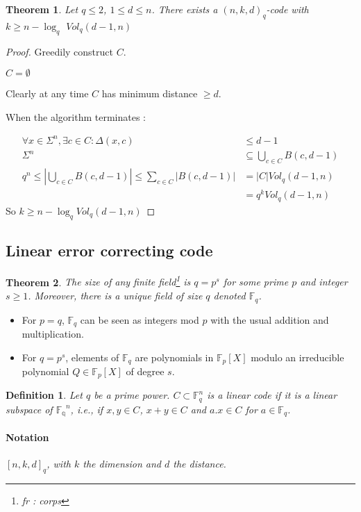 \documentclass{article}
\newtheorem{thm}{Theorem}
\newtheorem{defi}{Definition}
\begin{document}
\begin{thm}
Let $q\leq 2$, $1\leq d \leq n$. There exists a $(n,k,d)_q$-code with $k\geq n - \log_q$ $Vol_q(d-1,n)$
\end{thm}

\begin{proof}
Greedily construct $C$.

\begin{algorithm}
$C=\emptyset$\\
\end{algorithm}

Clearly at any time $C$ has minimum distance $\geq d$.

When the algorithm terminates :

\begin{align*}
\forall x \in \Sigma^n, \exists c \in C : \Delta (x,c) & \leq d-1\\
\Sigma^n & \subseteq \bigcup_{c\in C} B(c, d-1)\\
q^n \leq |\bigcup_{c\in C} B(c,d-1)| \leq \sum_{c\in C} |B(c,d-1)| & = |C| Vol_q(d-1, n)\\
& = q^k Vol_q(d-1,n)
\end{align*}
So $k\geq n - \log_q Vol_q (d-1,n)$
\end{proof}

\subsection{Linear error correcting code}


\begin{thm}
The size of any finite field\footnote{fr : corps} is $q=p^s$ for some prime $p$ and integer $s\geq 1$. Moreover, there is a unique field of size $q$ denoted $\mathbb{F}_q$.
\end{thm}

\begin{itemize}
\item For $p=q$, $\mathbb{F}_q$ can be seen as integers mod $p$ with the usual addition and multiplication.
\item For $q=p^s$, elements of $\mathbb{F}_q$ are polynomials in $\mathbb{F}_p [X]$ modulo an irreducible polynomial $Q\in \mathbb{F}_p[X]$ of degree $s$.
\end{itemize}

\begin{defi}
Let $q$ be a prime power.
$C \subset\mathbb{F}_q^n$ is a linear code if it is a linear subspace of $\mathbb{F_q}^n$, i.e., if $x,y\in C$, $x+y \in C$ and $a.x\in C$ for $a\in \mathbb{F}_q$.
\paragraph{Notation} $[n,k,d]_q$, with $k$ the dimension and $d$ the distance.
\end{defi}
\end{document}
